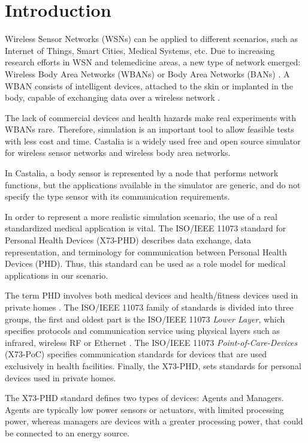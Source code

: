 \section{Introduction}

Wireless Sensor Networks (WSNs) can be applied to different scenarios, such as Internet of Things, Smart Cities, Medical Systems, etc. Due to increasing research efforts in WSN and telemedicine areas, a new type of network emerged: Wireless Body Area Networks (WBANs) or Body Area Networks (BANs) \cite{b21}. A WBAN consists of intelligent devices, attached to the skin or implanted in the body, capable of exchanging data over a wireless network \cite{b18}.

The lack of commercial devices and health hazards make real experiments with WBANs rare. Therefore, simulation is an important tool to allow feasible tests with less cost and time. Castalia \cite{b15} is a widely used free and open source simulator for wireless sensor networks and wireless body area networks. 

In Castalia, a body sensor is represented by a node that performs network functions, but the applications available in the simulator are generic, and do not specify the type sensor with its communication requirements. 

In order to represent a more realistic simulation scenario, the use of a real standardized medical application is vital. The ISO/IEEE 11073 standard for Personal Health Devices (X73-PHD) describes data exchange, data representation, and terminology for communication between Personal Health Devices (PHD). Thus, this standard can be used as a role model for medical applications in our scenario.

The term PHD involves both medical devices and health/fitness devices used in private homes \cite{b3}. The ISO/IEEE 11073 family of standards is divided into three groups, the first and oldest part is the ISO/IEEE 11073 \textit{Lower Layer}, which specifies protocols and communication service using physical layers such as infrared, wireless RF or Ethernet \cite{b16}. The ISO/IEEE 11073 \textit{Point-of-Care-Devices} (X73-PoC) specifies communication standards for devices that are used exclusively in health facilities. Finally, the X73-PHD, sets standards for personal devices used in private homes.

The X73-PHD standard defines two types of devices: Agents and Managers. Agents are typically low power sensors or actuators, with limited processing power, whereas managers are devices with a greater processing power, that could be connected to an energy source.

